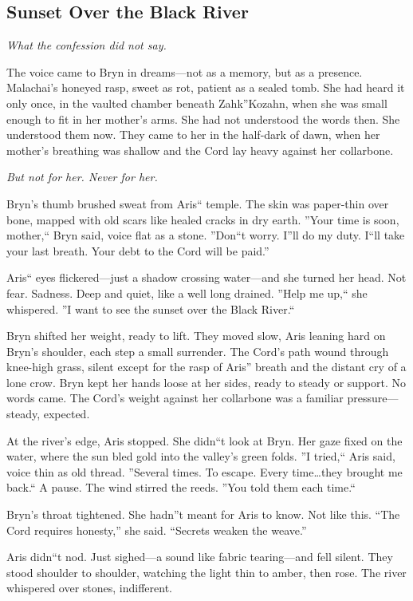 \begin{visionbox}
\subsection*{Sunset Over the Black River}
\emph{What the confession did not say.}

\medskip
\noindent The voice came to Bryn in dreams---not as a memory, but as a presence. Malachai's honeyed rasp, sweet as rot, patient as a sealed tomb. She had heard it only once, in the vaulted chamber beneath Zahk''Kozahn, when she was small enough to fit in her mother's arms. She had not understood the words then. She understood them now. They came to her in the half-dark of dawn, when her mother's breathing was shallow and the Cord lay heavy against her collarbone.

\textit{But not for her. Never for her.}

Bryn's thumb brushed sweat from Aris`` temple. The skin was paper-thin over bone, mapped with old scars like healed cracks in dry earth. ''Your time is soon, mother,`` Bryn said, voice flat as a stone. ''Don``t worry. I''ll do my duty. I``ll take your last breath. Your debt to the Cord will be paid.''

Aris`` eyes flickered---just a shadow crossing water---and she turned her head. Not fear. Sadness. Deep and quiet, like a well long drained. ''Help me up,`` she whispered. ''I want to see the sunset over the Black River.``

Bryn shifted her weight, ready to lift. They moved slow, Aris leaning hard on Bryn's shoulder, each step a small surrender. The Cord's path wound through knee-high grass, silent except for the rasp of Aris'' breath and the distant cry of a lone crow. Bryn kept her hands loose at her sides, ready to steady or support. No words came. The Cord's weight against her collarbone was a familiar pressure---steady, expected.

At the river's edge, Aris stopped. She didn``t look at Bryn. Her gaze fixed on the water, where the sun bled gold into the valley's green folds. ''I tried,`` Aris said, voice thin as old thread. ''Several times. To escape. Every time\dots they brought me back.`` A pause. The wind stirred the reeds. ''You told them each time.``

Bryn's throat tightened. She hadn''t meant for Aris to know. Not like this. ``The Cord requires honesty,'' she said. ``Secrets weaken the weave.''

Aris didn``t nod. Just sighed---a sound like fabric tearing---and fell silent. They stood shoulder to shoulder, watching the light thin to amber, then rose. The river whispered over stones, indifferent.


\end{visionbox}

